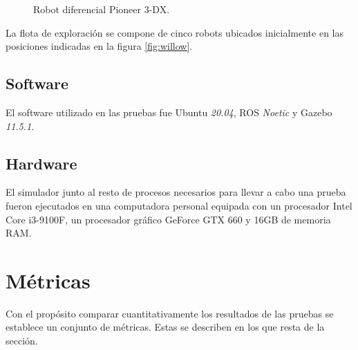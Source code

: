\begin{figure}[H]
  \centerfloat

  \qquad

  \caption[Robot diferencial Pioneer 3-DX.]{Robot diferencial Pioneer 3-DX.}\label{fig:p3dx}

\end{figure}

La flota de exploración se compone de cinco robots ubicados inicialmente en las posiciones
indicadas en la figura \ref{fig:willow}.

\subsection{Software}
El software utilizado en las pruebas fue Ubuntu \emph{20.04}, \gls{ROS} \emph{Noetic} y Gazebo
\emph{11.5.1}. 

\subsection{Hardware}
El simulador junto al resto de procesos necesarios para llevar a cabo una
prueba fueron ejecutados en una computadora personal equipada con un procesador
Intel Core i3-9100F, un procesador gráfico GeForce GTX 660 y 16GB de memoria
RAM.

\section{Métricas}
Con el propósito comparar cuantitativamente los resultados de las pruebas se
establece un conjunto de métricas. Estas se describen en los que resta de la
sección. 

